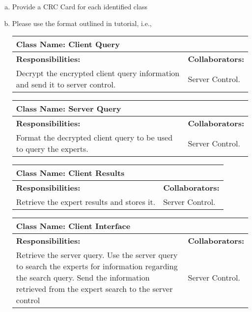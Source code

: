 \documentclass[]{article}
\begin{document}
\begin{enumerate}[a)]
	\item Provide a CRC Card for each identified class
	\item Please use the format outlined in tutorial, i.e., 
	\begin{table}[ht]
		\centering
		\begin{tabular}{|p{5cm}|p{5cm}|}
		\hline 
		 \multicolumn{2}{|l|}{\textbf{Class Name: Client Query}} \\
		\hline
		\textbf{Responsibilities: } & \textbf{Collaborators:} \\
		\hline
		Decrypt the encrypted client query information and send it to server control.	
		\vspace{1in} & Server Control.\\
		
		\hline				
		\end{tabular}
	\end{table}
	
\begin{table}[ht]
		\centering
		\begin{tabular}{|p{5cm}|p{5cm}|}
		\hline 
		 \multicolumn{2}{|l|}{\textbf{Class Name: Server Query}} \\
		\hline
		\textbf{Responsibilities: } & \textbf{Collaborators:} \\
		\hline
		Format the decrypted client query to be used to query the experts.	
		\vspace{1in} & Server Control.\\
		
		\hline				
		\end{tabular}
	\end{table}

\begin{table}[ht]
		\centering
		\begin{tabular}{|p{5cm}|p{5cm}|}
		\hline 
		 \multicolumn{2}{|l|}{\textbf{Class Name: Client Results}} \\
		\hline
		\textbf{Responsibilities: } & \textbf{Collaborators:} \\
		\hline
		Retrieve the expert results and stores it.	
		\vspace{1in} & Server Control.\\
		
		\hline				
		\end{tabular}
	\end{table}

\begin{table}[ht]
		\centering
		\begin{tabular}{|p{5cm}|p{5cm}|}
		\hline 
		 \multicolumn{2}{|l|}{\textbf{Class Name: Client Interface}} \\
		\hline
		\textbf{Responsibilities: } & \textbf{Collaborators:} \\
		\hline
		Retrieve the server query. Use the server query to search the experts for information regarding the search query. Send the information retrieved from the expert search to the server control	
		\vspace{1in} & Server Control.\\
		

\end{tabular}
\end{table}
\end{enumerate}
\end{document}
